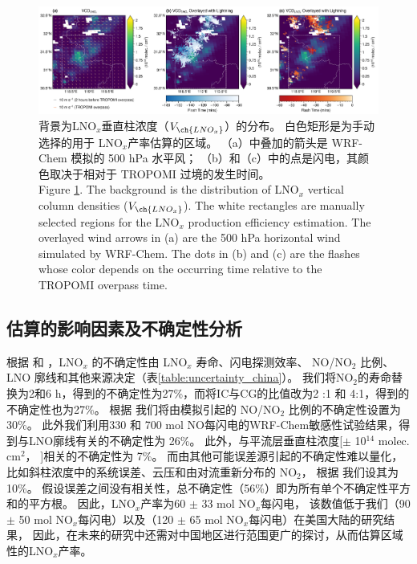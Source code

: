 \begin{figure}[!htbp]
    \centering
    \includegraphics[width=16cm]{./figures/china_vcd_lnox.png}
    \caption{
    背景为LNO$_x$垂直柱浓度（$V_{\ch{LNO_x}}$）的分布。
     白色矩形是为手动选择的用于 LNO$_x$产率估算的区域。
     （a）中叠加的箭头是 WRF-Chem 模拟的 500 hPa 水平风；
     （b）和（c）中的点是闪电，其颜色取决于相对于 TROPOMI 过境的发生时间。\\
    Figure \ref{fig:china_vcd_lnox}. The background is the distribution of LNO$_x$ vertical column densities ($V_{\ch{LNO_x}}$).
    The white rectangles are manually selected regions for the LNO$_x$ production efficiency estimation.
    The overlayed wind arrows in (a) are the 500 hPa horizontal wind simulated by WRF-Chem.
    The dots in (b) and (c) are the flashes whose color depends on the occurring time relative to the TROPOMI overpass time.
    }
    \label{fig:china_vcd_lnox}
\end{figure}



\subsection{估算的影响因素及不确定性分析} \label{sec:uncertainty_china}

根据 \citet{Allen.2019} 和 \citet{Zhang.2020b}，LNO$_x$ 的不确定性由 LNO$_x$ 寿命、闪电探测效率、
NO/NO$_2$ 比例、LNO 廓线和其他来源决定（表\ref{table:uncertainty_china}）。
我们将NO$_2$的寿命替换为2和6 h，得到的不确定性为27\%，而将IC与CG的比值改为2 :1 和 4:1，得到的不确定性也为27\%。
根据 \citet{Allen.2019} 我们将由模拟引起的 NO/NO$_2$ 比例的不确定性设置为 30\%。
此外我们利用330 和 700 mol NO每闪电的WRF-Chem敏感性试验结果，得到与LNO廓线有关的不确定性为 26\%。
此外，与平流层垂直柱浓度[$\pm$ 10$^{14}$ molec. cm$^2$， \citet{VanGeffen.2022}]相关的不确定性为 7\%。
而由其他可能误差源引起的不确定性难以量化，比如斜柱浓度中的系统误差、云压和由对流重新分布的 NO$_2$，
根据 \citet{Allen.2021a}我们设其为10\%。
假设误差之间没有相关性，总不确定性（56\%）即为所有单个不确定性平方和的平方根。
因此，LNO$_x$产率为60 $\pm$ 33 mol NO$_x$每闪电，
该数值低于我们（90 $\pm$ 50 mol NO$_x$每闪电）以及\citet{Allen.2021a}（120 $\pm$ 65 mol NO$_x$每闪电）在美国大陆的研究结果，
因此，在未来的研究中还需对中国地区进行范围更广的探讨，从而估算区域性的LNO$_x$产率。


